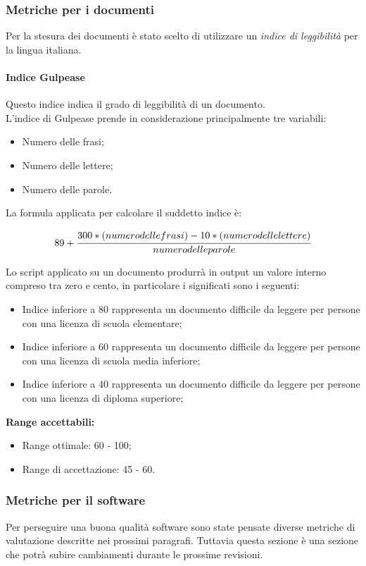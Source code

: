\documentclass{scalatekids-article}
\begin{document}
\subsubsection{Metriche per i documenti}
Per la stesura dei documenti è stato scelto di utilizzare un \textit{indice di leggibilità} per la lingua italiana.
\paragraph{Indice Gulpease}
Questo indice indica il grado di leggibilità di un documento.\\L'indice di Gulpease prende in considerazione principalmente tre variabili:
\begin{itemize}
\item Numero delle frasi;
\item Numero delle lettere;
\item Numero delle parole.
\end{itemize}
La formula applicata per calcolare il suddetto indice è:
\begin{center}
\begin{equation}
  89 + \cfrac{300 * (numero delle frasi) - 10 * (numero delle lettere)}{numero delle parole}
\end{equation}
\end{center}
Lo script applicato su un documento produrrà in output un valore interno compreso tra zero e cento, in particolare i significati sono i seguenti:
\begin{itemize}
  \item Indice inferiore a 80 rappresenta un documento difficile da leggere per persone con una licenza di scuola elementare;
  \item Indice inferiore a 60 rappresenta un documento difficile da leggere per persone con una licenza di scuola media inferiore;
  \item Indice inferiore a 40 rappresenta un documento difficile da leggere per persone con una licenza di diploma superiore;
\end{itemize}
\textbf{Range accettabili:}
\begin{itemize}
  \item Range ottimale: 60 - 100;
  \item Range di accettazione: 45 - 60.
\end{itemize}
\subsubsection{Metriche per il software}
Per perseguire una buona qualità software sono state pensate diverse metriche di valutazione descritte nei prossimi paragrafi. Tuttavia questa sezione è una sezione che potrà subire cambiamenti durante le prossime revisioni.
\end{document}
